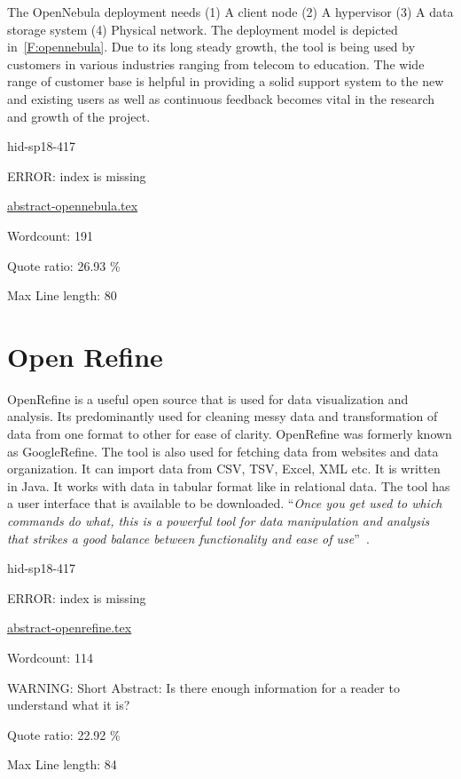 The OpenNebula deployment needs (1) A client node (2) A hypervisor (3)
A data storage system (4) Physical network.  The deployment model is
depicted in~\ref{F:opennebula}.  Due to its long steady growth, the
tool is being used by customers in various industries ranging from
telecom to education.  The wide range of customer base is helpful in
providing a solid support system to the new and existing users as well
as continuous feedback becomes vital in the research and growth of the
project.


\begin{IU}

hid-sp18-417

ERROR: index is missing

\href{https://github.com/cloudmesh-community/hid-sp18-417/blob/master//technology/abstract-opennebula.tex}{abstract-opennebula.tex}

 

Wordcount: 191


Quote ratio: 26.93 \%
 
Max Line length: 80
\end{IU}

\section{Open Refine}

OpenRefine is a useful open source that is used for data visualization
and analysis.  Its predominantly used for cleaning messy data and
transformation of data from one format to other for ease of clarity.
OpenRefine was formerly known as GoogleRefine. The tool is also used
for fetching data from websites and data organization. It can import
data from CSV, TSV, Excel, XML etc. It is written in Java. It works
with data in tabular format like in relational data. The tool has a
user interface that is available to be downloaded.  \color{blue}``\emph{Once you get
used to which commands do what, this is a powerful tool for data
manipulation and analysis that strikes a good balance between
functionality and ease of use}''\color{black}~\cite{hid-sp18-417-openrefine}.



\begin{IU}

hid-sp18-417

ERROR: index is missing

\href{https://github.com/cloudmesh-community/hid-sp18-417/blob/master//technology/abstract-openrefine.tex}{abstract-openrefine.tex}

 

Wordcount: 114

WARNING: Short Abstract: Is there enough information for a reader to understand what it is?


Quote ratio: 22.92 \%
 
Max Line length: 84
\end{IU}

